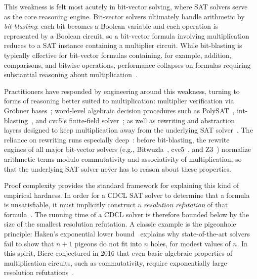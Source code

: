 \documentclass[11pt]{article}
\theoremstyle{definition}
\theoremstyle{remark}
\begin{document}
This weakness is felt most acutely in bit-vector solving, where SAT solvers serve as the core reasoning engine. Bit-vector solvers ultimately handle arithmetic by \emph{bit-blasting}: each bit becomes a Boolean variable and each operation is represented by a Boolean circuit, so a bit-vector formula involving multiplication reduces to a SAT instance containing a multiplier circuit. While bit-blasting is typically effective for bit-vector formulas containing, for example, addition, comparisons, and bitwise operations, performance collapses on formulas requiring substantial reasoning about multiplication~\cite{liew-thesis,bbkmt26}.

Practitioners have responded by engineering around this weakness, turning to forms of reasoning better suited to multiplication: multiplier verification via Gr\"obner bases~\cite{sayed-ahmed,rbk,kbk-fmcad,revsca,kbbn}; word-level algebraic decision procedures such as PolySAT~\cite{polysat}, int-blasting~\cite{intblast}, and cvc5's finite-field solver~\cite{okt}; as well as rewriting and abstraction layers designed to keep multiplication away from the underlying SAT solver~\cite{npz}. The reliance on rewriting runs especially deep~\cite{nprzbt}: before bit-blasting, the rewrite engines of all major bit-vector solvers (e.g., Bitwuzla~\cite{bitwuzla}, cvc5~\cite{cvc5}, and Z3~\cite{z3}) normalize arithmetic terms modulo commutativity and associativity of multiplication, so that the underlying SAT solver never has to reason about these properties.

Proof complexity provides the standard framework for explaining this kind of empirical
hardness. In order for a CDCL SAT solver to determine that a formula is unsatisfiable,
it must implicitly construct a \emph{resolution refutation} of
that formula~\cite{bks}. The running time of a CDCL solver is therefore bounded
below by the size of the smallest resolution refutation. A classic example is the pigeonhole principle: Haken's
exponential lower bound~\cite{haken} explains why state-of-the-art solvers
fail to show that $n+1$ pigeons do not fit into $n$ holes, for modest
values of $n$. In this spirit, Biere conjectured in 2016 that even basic algebraic
properties of multiplication circuits, such as commutativity, require
exponentially large resolution refutations~\cite{biere-fields}.
\end{document}
